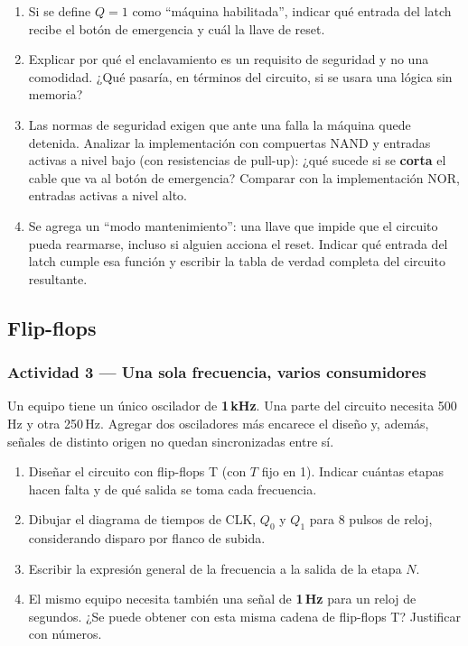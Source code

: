\begin{enumerate}[label=\alph*)]
    \item Si se define $Q = 1$ como ``máquina habilitada'', indicar qué entrada del latch recibe el botón de emergencia y cuál la llave de reset.
    \item Explicar por qué el enclavamiento es un requisito de seguridad y no una comodidad. ¿Qué pasaría, en términos del circuito, si se usara una lógica sin memoria?
    \item Las normas de seguridad exigen que ante una falla la máquina quede detenida. Analizar la implementación con compuertas NAND y entradas activas a nivel bajo (con resistencias de pull-up): ¿qué sucede si se \textbf{corta} el cable que va al botón de emergencia? Comparar con la implementación NOR, entradas activas a nivel alto.
    \item Se agrega un ``modo mantenimiento'': una llave que impide que el circuito pueda rearmarse, incluso si alguien acciona el reset. Indicar qué entrada del latch cumple esa función y escribir la tabla de verdad completa del circuito resultante.
\end{enumerate}

\subsection{Flip-flops}

\subsubsection*{Actividad 3 --- Una sola frecuencia, varios consumidores}

Un equipo tiene un único oscilador de \textbf{1\,kHz}. Una parte del circuito necesita 500\,Hz y otra 250\,Hz. Agregar dos osciladores más encarece el diseño y, además, señales de distinto origen no quedan sincronizadas entre sí.

\begin{enumerate}[label=\alph*)]
    \item Diseñar el circuito con flip-flops T (con $T$ fijo en 1). Indicar cuántas etapas hacen falta y de qué salida se toma cada frecuencia.
    \item Dibujar el diagrama de tiempos de CLK, $Q_0$ y $Q_1$ para 8 pulsos de reloj, considerando disparo por flanco de subida.
    \item Escribir la expresión general de la frecuencia a la salida de la etapa $N$.
    \item El mismo equipo necesita también una señal de \textbf{1\,Hz} para un reloj de segundos. ¿Se puede obtener con esta misma cadena de flip-flops T? Justificar con números.
\end{enumerate}

